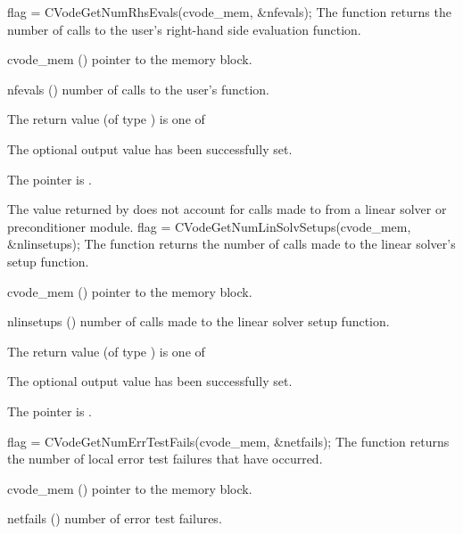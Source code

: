 {}
{
  flag = CVodeGetNumRhsEvals(cvode\_mem, \&nfevals);
}
{
  The function  returns the 
  number of calls to the user's right-hand side evaluation function.
}
{
  \begin{args}
  \item[cvode\_mem] ()
    pointer to the {\cvode} memory block.
  \item[nfevals] ()
    number of calls to the user's  function.
  \end{args}
}
{
  The return value  (of type ) is one of
  \begin{args}
  \item[\Id{CV\_SUCCESS}] 
    The optional output value has been successfully set.
  \item[\Id{CV\_MEM\_NULL}]
    The  pointer is .
  \end{args}
}
{
  The  value returned by  does not
  account for calls made to  from a linear solver or preconditioner 
  module. 
}
{
  flag = CVodeGetNumLinSolvSetups(cvode\_mem, \&nlinsetups);
}
{
  The function  returns the
  number of calls made to the linear solver's setup function.
}
{
  \begin{args}[nlinsetups]
  \item[cvode\_mem] ()
    pointer to the {\cvode} memory block.
  \item[nlinsetups] ()
    number of calls made to the linear solver setup function.
  \end{args}
}
{
  The return value  (of type ) is one of
  \begin{args}
  \item[\Id{CV\_SUCCESS}] 
    The optional output value has been successfully set.
  \item[\Id{CV\_MEM\_NULL}]
    The  pointer is .
  \end{args}
}
{}
{
  flag = CVodeGetNumErrTestFails(cvode\_mem, \&netfails);
}
{
  The function  returns the
  number of local error test failures that have occurred.
}
{
  \begin{args}
  \item[cvode\_mem] ()
    pointer to the {\cvode} memory block.
  \item[netfails] ()
    number of error test failures.
  \end{args}
}

